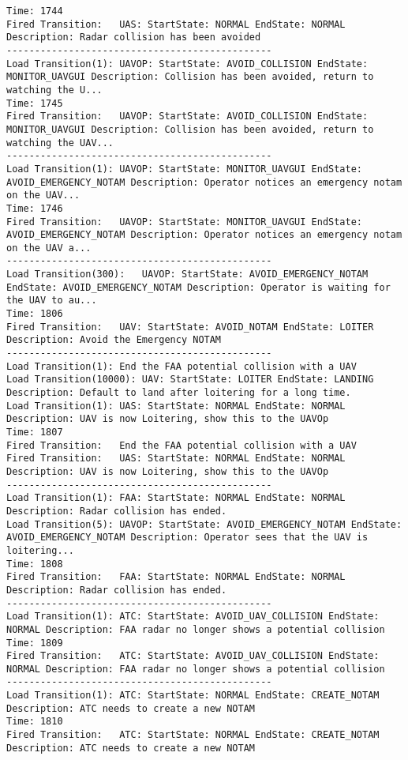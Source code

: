 \begin{spacing}{1}
\begin{verbatim}
Time: 1744
Fired Transition:	UAS: StartState: NORMAL EndState: NORMAL Description: Radar collision has been avoided
-----------------------------------------------
Load Transition(1):	UAVOP: StartState: AVOID_COLLISION EndState: MONITOR_UAVGUI Description: Collision has been avoided, return to watching the U...
Time: 1745
Fired Transition:	UAVOP: StartState: AVOID_COLLISION EndState: MONITOR_UAVGUI Description: Collision has been avoided, return to watching the UAV...
-----------------------------------------------
Load Transition(1):	UAVOP: StartState: MONITOR_UAVGUI EndState: AVOID_EMERGENCY_NOTAM Description: Operator notices an emergency notam on the UAV...
Time: 1746
Fired Transition:	UAVOP: StartState: MONITOR_UAVGUI EndState: AVOID_EMERGENCY_NOTAM Description: Operator notices an emergency notam on the UAV a...
-----------------------------------------------
Load Transition(300):	UAVOP: StartState: AVOID_EMERGENCY_NOTAM EndState: AVOID_EMERGENCY_NOTAM Description: Operator is waiting for the UAV to au...
Time: 1806
Fired Transition:	UAV: StartState: AVOID_NOTAM EndState: LOITER Description: Avoid the Emergency NOTAM
-----------------------------------------------
Load Transition(1):	End the FAA potential collision with a UAV
Load Transition(10000):	UAV: StartState: LOITER EndState: LANDING Description: Default to land after loitering for a long time.
Load Transition(1):	UAS: StartState: NORMAL EndState: NORMAL Description: UAV is now Loitering, show this to the UAVOp
Time: 1807
Fired Transition:	End the FAA potential collision with a UAV
Fired Transition:	UAS: StartState: NORMAL EndState: NORMAL Description: UAV is now Loitering, show this to the UAVOp
-----------------------------------------------
Load Transition(1):	FAA: StartState: NORMAL EndState: NORMAL Description: Radar collision has ended.
Load Transition(5):	UAVOP: StartState: AVOID_EMERGENCY_NOTAM EndState: AVOID_EMERGENCY_NOTAM Description: Operator sees that the UAV is loitering...
Time: 1808
Fired Transition:	FAA: StartState: NORMAL EndState: NORMAL Description: Radar collision has ended.
-----------------------------------------------
Load Transition(1):	ATC: StartState: AVOID_UAV_COLLISION EndState: NORMAL Description: FAA radar no longer shows a potential collision
Time: 1809
Fired Transition:	ATC: StartState: AVOID_UAV_COLLISION EndState: NORMAL Description: FAA radar no longer shows a potential collision
-----------------------------------------------
Load Transition(1):	ATC: StartState: NORMAL EndState: CREATE_NOTAM Description: ATC needs to create a new NOTAM
Time: 1810
Fired Transition:	ATC: StartState: NORMAL EndState: CREATE_NOTAM Description: ATC needs to create a new NOTAM

\end{verbatim}
\end{spacing}
